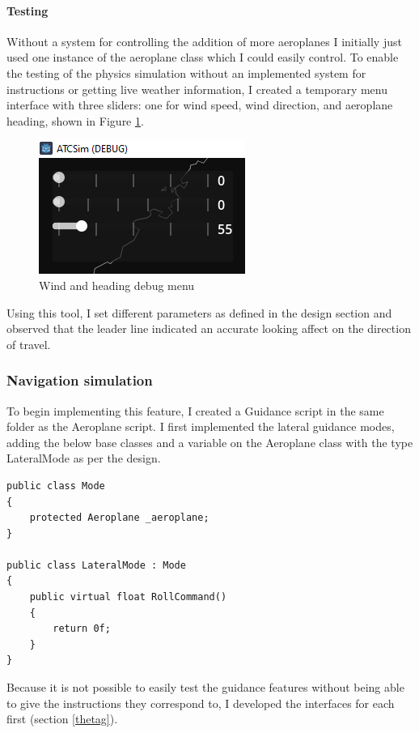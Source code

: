 \documentclass{article}
\begin{document}
\paragraph{Testing}
Without a system for controlling the addition of more aeroplanes I initially just used one instance of the aeroplane class which I could easily control.
To enable the testing of the physics simulation without an implemented system for instructions or getting live weather information, I created a temporary menu interface with three sliders: one for wind speed, wind direction, and aeroplane heading, shown in Figure \ref{fig:winddebug}.
\begin{figure}[H]
\centering
\includegraphics{screenshots/winddebug.png}
\caption{\label{fig:winddebug}Wind and heading debug menu}
\end{figure}
Using this tool, I set different parameters as defined in the design section and observed that the leader line indicated an accurate looking affect on the direction of travel.

\subsubsection{Navigation simulation}
To begin implementing this feature, I created a Guidance script in the same folder as the Aeroplane script.
I first implemented the lateral guidance modes, adding the below base classes and a variable on the Aeroplane class with the type LateralMode as per the design.
\lstset{style=csharp}
\begin{lstlisting}[caption=Guidance base classes]
public class Mode
{
    protected Aeroplane _aeroplane;
}

public class LateralMode : Mode
{
    public virtual float RollCommand()
    {
        return 0f;
    }
}
\end{lstlisting}
Because it is not possible to easily test the guidance features without being able to give the instructions they correspond to, I developed the interfaces for each first (section \ref{thetag}).
\end{document}
